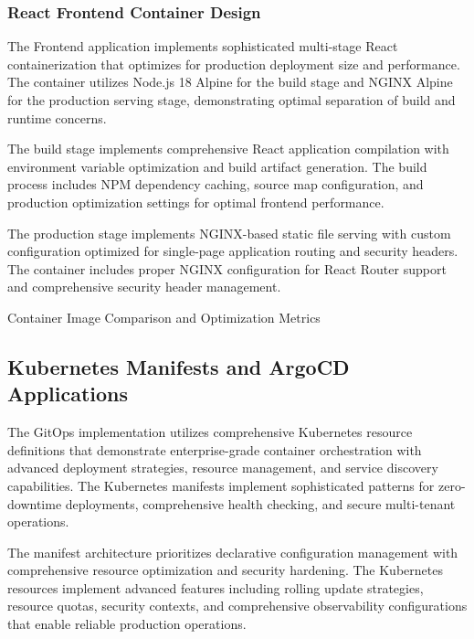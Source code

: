 \subsubsection{React Frontend Container Design}

The Frontend application implements sophisticated multi-stage React containerization that optimizes for production deployment size and performance. The container utilizes Node.js 18 Alpine for the build stage and NGINX Alpine for the production serving stage, demonstrating optimal separation of build and runtime concerns.

The build stage implements comprehensive React application compilation with environment variable optimization and build artifact generation. The build process includes NPM dependency caching, source map configuration, and production optimization settings for optimal frontend performance.

The production stage implements NGINX-based static file serving with custom configuration optimized for single-page application routing and security headers. The container includes proper NGINX configuration for React Router support and comprehensive security header management.

\begin{table}[H]
\centering
\caption{Container Image Comparison and Optimization Metrics}
\label{tab:container-image-metrics}
\end{table}

\subsection{Kubernetes Manifests and ArgoCD Applications}

The GitOps implementation utilizes comprehensive Kubernetes resource definitions that demonstrate enterprise-grade container orchestration with advanced deployment strategies, resource management, and service discovery capabilities. The Kubernetes manifests implement sophisticated patterns for zero-downtime deployments, comprehensive health checking, and secure multi-tenant operations.

The manifest architecture prioritizes declarative configuration management with comprehensive resource optimization and security hardening. The Kubernetes resources implement advanced features including rolling update strategies, resource quotas, security contexts, and comprehensive observability configurations that enable reliable production operations.


